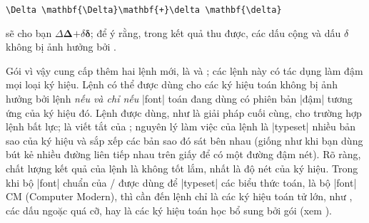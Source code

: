 \documentclass[11pt,leqno,titlepage,openany,oneside]{amsldoc}[1999/12/13]
\begin{document}
\medskip
\begin{verbatim}
\Delta \mathbf{\Delta}\mathbf{+}\delta \mathbf{\delta}
\end{verbatim}

\medskip\noindent
sẽ cho bạn $\Delta \mathbf{\Delta}\mathbf{+}\delta \mathbf{\delta}$;
để ý rằng, trong kết quả thu được, các dấu cộng và dấu $\delta$ không
bị ảnh hưởng bởi .

\medskip
Gói  vì vậy cung cấp thêm hai lệnh mới, là
 và ; các lệnh này có tác dụng làm đậm mọi loại
ký hiệu. Lệnh  có thể được dùng cho các ký hiệu toán không
bị ảnh hưởng bởi lệnh  \emph{nếu và chỉ nếu} |font| toán
đang dùng có phiên bản |đậm| tương ứng của ký hiệu đó. Lệnh 
được dùng, như là giải pháp cuối cùng, cho trường hợp lệnh 
bất lực;  là viết tắt của ;
nguyên lý làm việc của lệnh  là |typeset| nhiều bản sao của
ký hiệu và sắp xếp các bản sao đó sát bên nhau (giống như khi bạn
dùng bút kẻ nhiều đường liên tiếp nhau trên giấy để có một đường đậm nét).
Rõ ràng, chất lượng kết quả của lệnh  là không tốt lắm, nhất là
độ nét của ký hiệu. Trong khi bộ |font| chuẩn của \latex/ được dùng để
|typeset| các biểu thức toán, là bộ |font| CM (Computer Modern), thì cần đến
lệnh  chỉ là các ký hiệu toán tử lớn, như ,
các dấu ngoặc quá cỡ, hay là các ký hiệu toán học bổ sung bởi gói
 (xem \cite{amsfonts}).
\end{document}

